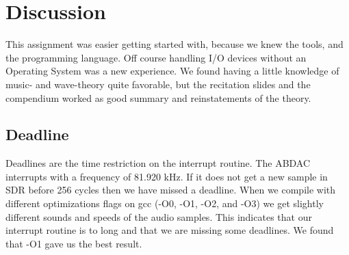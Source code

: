 \section{Discussion}
This assignment was easier getting started with, because we knew the tools,  and the programming language.
Off course handling I/O devices without an Operating System was a new experience. We found having a little
knowledge of music- and wave-theory quite favorable, but the recitation slides and the compendium worked as
good summary and reinstatements of the theory.

\subsection{Deadline}
Deadlines are the time restriction on the interrupt routine. The ABDAC interrupts with a frequency of 81.920 kHz.
If it does not get a new sample in SDR before 256 cycles then we have missed a deadline. When we compile with
different optimizations flags on gcc (-O0, -O1, -O2, and -O3) we get slightly different sounds and speeds of the
audio samples. This indicates that our interrupt routine is to long and that we are missing some deadlines.
We found that -O1 gave us the best result.
